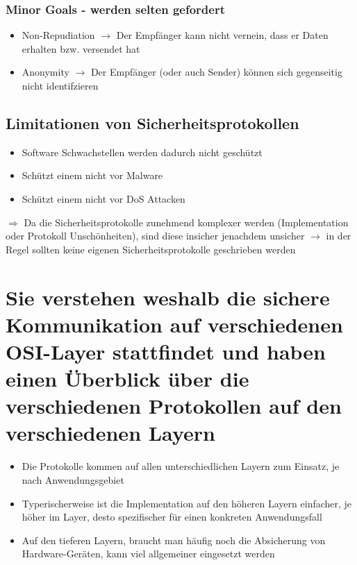 \documentclass{report}
\theoremstyle{definition}
\theoremstyle{example}
\begin{document}
		\subsubsection{Minor Goals - werden selten gefordert}
	\begin{itemize}
		\item Non-Repudiation $\rightarrow$ Der Empfänger kann nicht vernein, dass er Daten erhalten bzw. versendet hat
		\item Anonymity $\rightarrow$ Der Empfänger (oder auch Sender) können sich gegenseitig nicht identifzieren
	\end{itemize}

	\subsection{Limitationen von Sicherheitsprotokollen}
	\begin{itemize}
		\item Software Schwachstellen werden dadurch nicht geschützt
		\item Schützt einem nicht vor Malware
		\item Schützt einem nicht vor DoS Attacken
	\end{itemize}
	$\Rightarrow$ Da die Sicherheitsprotokolle zunehmend komplexer werden (Implementation oder Protokoll Unschönheiten), sind diese insicher jenachdem unsicher $\rightarrow$ in der Regel sollten keine eigenen Sicherheitsprotokolle geschrieben werden

\section{Sie verstehen weshalb die sichere Kommunikation auf verschiedenen OSI-Layer stattfindet und haben einen Überblick über die verschiedenen Protokollen auf den verschiedenen Layern}


	\begin{itemize}
		\item Die Protokolle kommen auf allen unterschiedlichen Layern zum Einsatz, je nach Anwendungsgebiet
		\item Typerischerweise ist die Implementation auf den höheren Layern einfacher, je höher im Layer, desto spezifischer für einen konkreten Anwendungsfall
		\item Auf den tieferen Layern, braucht man häufig noch die Absicherung von Hardware-Geräten, kann viel allgemeiner eingesetzt werden
	\end{itemize}
\end{document}
